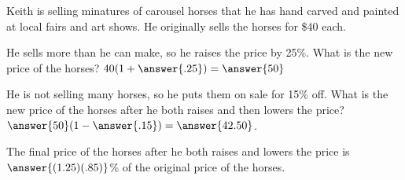 \documentclass{ximera}
\author{Elizabeth Miller}
\begin{document}
Keith is selling minatures of carousel horses that he has hand carved and painted at local fairs and art shows.  He originally sells the horses for \$40 each.  
\begin{exercise}
He sells more than he can make, so he raises the price by 25\%.  What is the new price of the horses?  $40(1+\answer{.25})=\answer{50}$
\end{exercise}
\begin{exercise}
He is not selling many horses, so he puts them on sale for 15\% off.  What is the new price of the horses after he both raises and then lowers the price?  $\answer{50}(1-\answer{.15})=\answer{42.50}$.  
\end{exercise}
\begin{exercise}
The final price of the horses after he both raises and lowers the price is $\answer{(1.25)(.85)}$\% of the original price of the horses.
\end{exercise}
\end{document}
